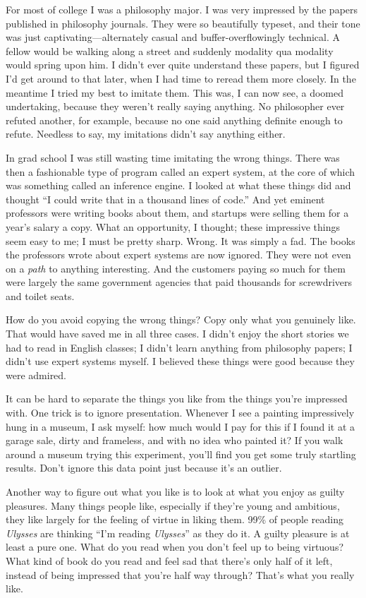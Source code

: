 \documentclass[12pt]{book}
\begin{document}
For most of college I was a philosophy major. I was very impressed by
the papers published in philosophy journals. They were so beautifully
typeset, and their tone was just captivating---alternately casual and
buffer-overflowingly technical. A fellow would be walking along a street
and suddenly modality qua modality would spring upon him. I didn't ever
quite understand these papers, but I figured I'd get around to that
later, when I had time to reread them more closely. In the meantime I
tried my best to imitate them. This was, I can now see, a doomed
undertaking, because they weren't really saying anything. No philosopher
ever refuted another, for example, because no one said anything definite
enough to refute. Needless to say, my imitations didn't say anything
either.

In grad school I was still wasting time imitating the wrong things.
There was then a fashionable type of program called an expert system, at
the core of which was something called an inference engine. I looked at
what these things did and thought ``I could write that in a thousand
lines of code.'' And yet eminent professors were writing books about
them, and startups were selling them for a year's salary a copy. What an
opportunity, I thought; these impressive things seem easy to me; I must
be pretty sharp. Wrong. It was simply a fad. The books the professors
wrote about expert systems are now ignored. They were not even on a
\emph{path} to anything interesting. And the customers paying so much
for them were largely the same government agencies that paid thousands
for screwdrivers and toilet seats.

How do you avoid copying the wrong things? Copy only what you genuinely
like. That would have saved me in all three cases. I didn't enjoy the
short stories we had to read in English classes; I didn't learn anything
from philosophy papers; I didn't use expert systems myself. I believed
these things were good because they were admired.

It can be hard to separate the things you like from the things you're
impressed with. One trick is to ignore presentation. Whenever I see a
painting impressively hung in a museum, I ask myself: how much would I
pay for this if I found it at a garage sale, dirty and frameless, and
with no idea who painted it? If you walk around a museum trying this
experiment, you'll find you get some truly startling results. Don't
ignore this data point just because it's an outlier.

Another way to figure out what you like is to look at what you enjoy as
guilty pleasures. Many things people like, especially if they're young
and ambitious, they like largely for the feeling of virtue in liking
them. 99\% of people reading \emph{Ulysses} are thinking ``I'm reading
\emph{Ulysses}'' as they do it. A guilty pleasure is at least a pure
one. What do you read when you don't feel up to being virtuous? What
kind of book do you read and feel sad that there's only half of it left,
instead of being impressed that you're half way through? That's what you
really like.
\end{document}
